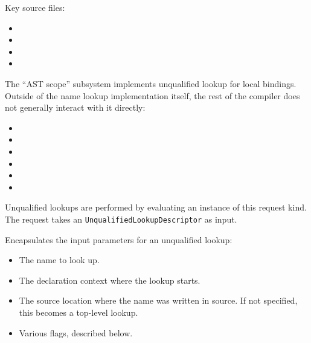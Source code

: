 \documentclass[../generics]{subfiles}
\begin{document}
Key source files:
\begin{itemize}
\item {}
\item {}
\item {}
\item {}
\end{itemize}
The ``AST scope'' subsystem implements unqualified lookup for local bindings. Outside of the name lookup implementation itself, the rest of the compiler does not generally interact with it directly:
\begin{itemize}
\item {}
\item {}
\item {}
\item {}
\item {}
\item {}
\end{itemize}

Unqualified lookups are performed by evaluating an instance of this request kind. The request takes an \texttt{UnqualifiedLookupDescriptor} as input.

Encapsulates the input parameters for an unqualified lookup:
\begin{itemize}
\item The name to look up.
\item The declaration context where the lookup starts.
\item The source location where the name was written in source. If not specified, this becomes a top-level lookup.
\item Various flags, described below.
\end{itemize}
\end{document}
